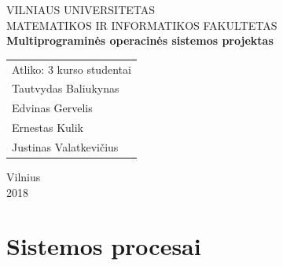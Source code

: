 \documentclass{scrartcl}
\begin{document}
    \newcommand{\instr}[3]{\subparagraph{\makebox[6em][l]{\texttt{#1}}} (\texttt{#2})\par#3\par}
    \begin{titlepage}
        \begin{center}
            VILNIAUS UNIVERSITETAS \\
            MATEMATIKOS IR INFORMATIKOS FAKULTETAS \\
            \vspace{4cm}
            \Large\textbf{Multiprograminės operacinės sistemos projektas}
        \end{center}
        \vspace{4cm}
        \begin{flushright}
            \begin{tabular}[t]{l}
                Atliko: 3 kurso studentai \\
                Tautvydas Baliukynas \\
                Edvinas Gervelis \\
                Ernestas Kulik \\
                Justinas Valatkevičius
            \end{tabular}
        \end{flushright}
        \vspace*{\fill}
        \begin{center}
            \large{Vilnius \\ 2018}
        \end{center}
    \end{titlepage}

    \section{Sistemos procesai}
\end{document}
